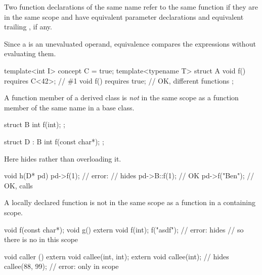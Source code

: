 \pnum
Two function declarations of the same name refer to the same function if they
are in the same scope and have equivalent parameter declarations
and equivalent trailing , if any.
\begin{note}
Since a  is an unevaluated operand,
equivalence compares the expressions without evaluating them.
\begin{example}
\begin{codeblock}
template<int I> concept C = true;
template<typename T> struct A {
  void f() requires C<42>;      // \#1
  void f() requires true;       // OK, different functions
};
\end{codeblock}
\end{example}
\end{note}
A function member of a derived class is
\textit{not}
in the same scope as a function member of the same name in a base class.
\begin{example}
\begin{codeblock}
struct B {
  int f(int);
};

struct D : B {
  int f(const char*);
};
\end{codeblock}

%
%
Here
hides
rather than overloading it.

%
\begin{codeblock}
void h(D* pd) {
  pd->f(1);                     // error:
                                //  hides 
  pd->B::f(1);                  // OK
  pd->f("Ben");                 // OK, calls 
}
\end{codeblock}
\end{example}

\pnum
A locally declared function is not in the same scope as a function in
a containing scope.
\begin{example}
\begin{codeblock}
void f(const char*);
void g() {
  extern void f(int);
  f("asdf");                    // error:  hides 
                                // so there is no  in this scope
}

void caller () {
  extern void callee(int, int);
  {
    extern void callee(int);    // hides 
    callee(88, 99);             // error: only  in scope
  }
}
\end{codeblock}
\end{example}

